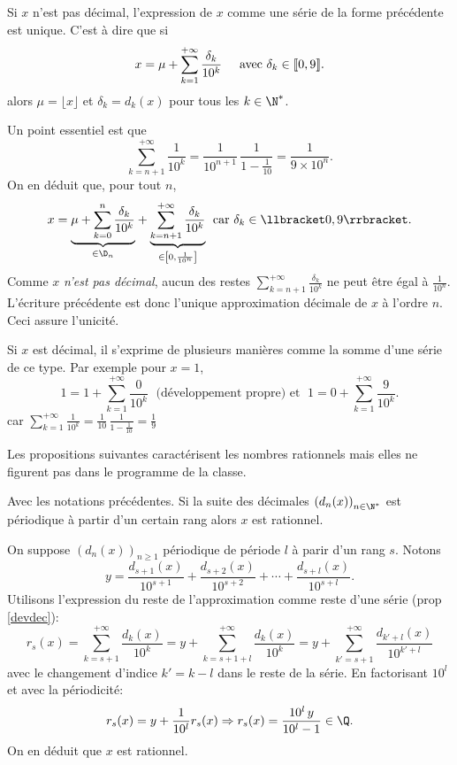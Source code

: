 \begin{propn}
 Si $x$ n'est pas décimal, l'expression de $x$ comme une série de la forme précédente est unique. C'est à dire que si
\[
 x = \mu + \sum_{k=1}^{+\infty} \frac{\delta_k}{10^k} \hspace{0.5cm} \text{avec } \delta_k \in \llbracket 0,9 \rrbracket.
\]
alors $\mu = \lfloor x \rfloor$ et $\delta_k = d_k(x)$ pour tous les $k \in \N^*$.
\end{propn}
\begin{demo}
Un point essentiel est que 
\[
\sum_{k=n+1}^{+\infty}\frac{1}{10^k} = \frac{1}{10^{n+1}}\,\frac{1}{1-\frac{1}{10}} = \frac{1}{9\times 10^n}.
\]
On en déduit que, pour tout $n$,
\[
 x = \underset{ \in \D_n}{\underbrace{\mu + \sum_{k=0}^{n}\frac{\delta_k}{10^k}}} 
 + \underset{ \in \left[ 0,\frac{1}{10^{n}}\right] }{\underbrace{\sum_{k=n+1}^{+\infty}\frac{\delta_k}{10^k}}}\; \text{ car } \delta_k \in \llbracket 0,9\rrbracket.
\]
Comme $x$ \emph{n'est pas décimal}, aucun des restes $\sum_{k=n+1}^{+\infty}\frac{\delta_k}{10^k}$ ne peut être égal à $\frac{1}{10^n}$. L'écriture précédente est donc l'unique approximation décimale de $x$ à l'ordre $n$. Ceci assure l'unicité.
\end{demo}
\begin{rem}
 Si $x$ est décimal, il s'exprime de plusieurs manières comme la somme d'une série de ce type. Par exemple pour $x=1$,
\[
 1 = 1 + \sum_{k=1}^{+\infty} \frac{0}{10^{k}} \;\text{ (développement propre) et } \; 1 = 0 + \sum_{k=1}^{+\infty} \frac{9}{10^{k}}.
\]
car $\sum_{k=1}^{+\infty} \frac{1}{10^{k}} = \frac{1}{10}\,\frac{1}{1 - \frac{1}{10}} = \frac{1}{9}$
\end{rem}
Les propositions suivantes caractérisent les nombres rationnels mais elles ne figurent pas dans le programme de la classe.
\begin{propn}
 Avec les notations précédentes. Si la suite des décimales $\left( d_n(x) \right)_{n \in \N^*}$ est périodique à partir d'un certain rang alors $x$ est rationnel. 
\end{propn}
\begin{demo}
 On suppose $\left( d_n(x) \right)_{n \geq 1}$ périodique de période $l$ à parir d'un rang $s$. Notons
\[
 y = \frac{d_{s+1}(x)}{10^{s+1}} + \frac{d_{s+2}(x)}{10^{s+2}} + \cdots + \frac{d_{s+l}(x)}{10^{s+l}}.  
\]
Utilisons l'expression du reste de l'approximation comme reste d'une série (prop \ref{devdec}):
\[
 r_{s}(x) = \sum_{k=s+1}^{+\infty}\frac{d_k(x)}{10^k}
 = y + \sum_{k=s+1+l}^{+\infty}\frac{d_k(x)}{10^k}
 = y + \sum_{k'= s+1}^{+\infty}\frac{d_{k'+l}(x)}{10^{k'+l}}
\]
avec le changement d'indice $k' = k - l$ dans le reste de la série. En factorisant $10^{l}$ et avec la périodicité:
\[
 r_s(x) = y + \frac{1}{10^l}r_s(x) \Rightarrow r_s(x) = \frac{10^l\,y}{10^l - 1} \in \Q.
\]
On en déduit que $x$ est rationnel. 
\end{demo}

